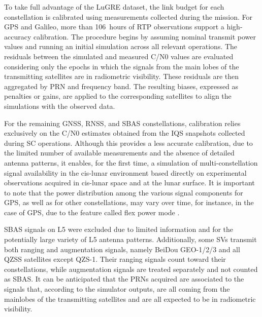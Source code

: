 \documentclass{IEEEtaes}
\begin{document}
To take full advantage of the LuGRE dataset, the link budget for each constellation is calibrated using measurements collected during the mission. For \gls{GPS} and Galileo, more than 106~hours of \gls{RTP} observations support a high-accuracy calibration. The procedure begins by assuming nominal transmit power values and running an initial simulation across all relevant operations. The residuals between the simulated and measured \gls{C/N0} values are evaluated considering only the epochs in which the signals from the main lobes of the transmitting satellites are in radiometric visibility. These residuals are then aggregated by \gls{PRN} and frequency band. The resulting biases, expressed as penalties or gains, are applied to the corresponding satellites to align the simulations with the observed data.

For the remaining \gls{GNSS}, \gls{RNSS}, and \gls{SBAS} constellations, calibration relies exclusively on the \gls{C/N0} estimates obtained from the \gls{IQS} snapshots collected during \gls{SC} operations. Although this provides a less accurate calibration, due to the limited number of available measurements and the absence of detailed antenna patterns, it enables, for the first time, a simulation of multi-constellation signal availability in the cis-lunar environment based directly on experimental observations acquired in cis-lunar space and at the lunar surface.
It is important to note that the power distribution among the various signal components for \gls{GPS}, as well as for other constellations, may vary over time, for instance, in the case of \gls{GPS}, due to the feature called flex power mode \cite{steigenberger2019flex}.

SBAS signals on L5 were excluded due to limited information and for the potentially large variety of L5 antenna patterns. Additionally, some \glspl{SV} transmit both ranging and augmentation signals, namely BeiDou GEO-1/2/3 and all \gls{QZSS} satellites except QZS-1. Their ranging signals count toward their constellations, while augmentation signals are treated separately and not counted as \gls{SBAS}.
It can be anticipated that the \glspl{PRN} acquired are associated to the signals that, according to the simulator outputs, are all coming from the mainlobes of the transmitting satellites and are all expected to be in radiometric visibility. 
\end{document}
